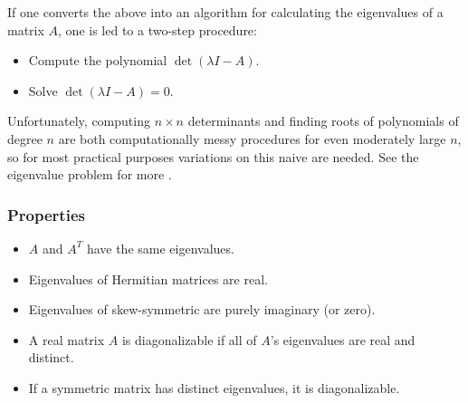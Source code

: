 \documentclass[12pt]{article}
\begin{document}
 If one converts the above  into an algorithm for calculating the eigenvalues of a matrix $A$, one is led to a two-step procedure:
 \begin{itemize}
 \item Compute the polynomial $\det(\lambda I - A)$.
 \item Solve $\det(\lambda I - A) = 0$.
 \end{itemize}
 Unfortunately, computing $n \times n$ determinants and finding roots of polynomials of degree $n$ are both computationally messy procedures for even moderately large $n$, so for most practical purposes variations on this naive  are needed. See the eigenvalue problem for more .
 
\subsubsection*{Properties}
\begin{itemize}
\item $A$ and $A^T$ have the same eigenvalues.
\item Eigenvalues of Hermitian matrices are real.
\item Eigenvalues of skew-symmetric are purely imaginary (or zero).
\item A real matrix $A$ is diagonalizable if all of $A$'s eigenvalues are real and distinct.
\item If a symmetric matrix has distinct eigenvalues, it is diagonalizable.
\end{itemize}
\end{document}
